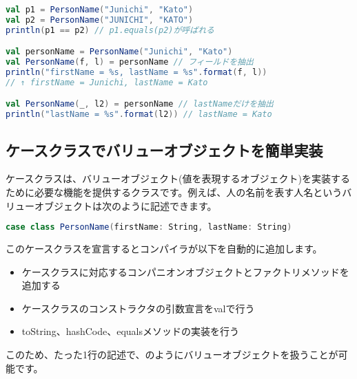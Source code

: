 \begin{lstlisting}[language=scala, label=src:case_class, caption=ケースクラスで定義したバリューオブジェクトの利用]
val p1 = PersonName("Junichi", "Kato")
val p2 = PersonName("JUNICHI", "KATO")
println(p1 == p2) // p1.equals(p2)が呼ばれる

val personName = PersonName("Junichi", "Kato")
val PersonName(f, l) = personName // フィールドを抽出
println("firstName = %s, lastName = %s".format(f, l))
// ↑ firstName = Junichi, lastName = Kato

val PersonName(_, l2) = personName // lastNameだけを抽出
println("lastName = %s".format(l2)) // lastName = Kato
\end{lstlisting}

\subsection{ケースクラスでバリューオブジェクトを簡単実装}
ケースクラスは、バリューオブジェクト(値を表現するオブジェクト)を実装するために必要な機能を提供するクラスです。例えば、人の名前を表す人名というバリューオブジェクトは次のように記述できます。
\begin{lstlisting}[language=scala, frame=none]
case class PersonName(firstName: String, lastName: String)
\end{lstlisting}
このケースクラスを宣言するとコンパイラが以下を自動的に追加します。

\begin{itemize}
\item ケースクラスに対応するコンパニオンオブジェクトとファクトリメソッドを追加する
\item ケースクラスのコンストラクタの引数宣言をvalで行う
\item toString、hashCode、equalsメソッドの実装を行う
\end{itemize}

このため、たった1行の記述で、のようにバリューオブジェクトを扱うことが可能です。

